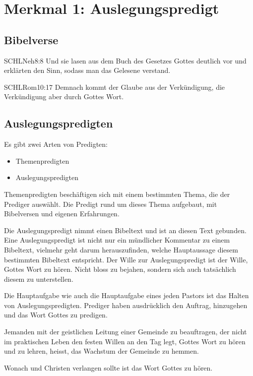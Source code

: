 \documentclass{../../inc/mybib}
\author{OTS}
\begin{document}
\tableofcontents

\section{Merkmal 1: Auslegungspredigt}
\subsection{Bibelverse}
\begin{bibelbox}{SCHL}{Neh}{8:8}
    Und sie lasen aus dem Buch des Gesetzes Gottes deutlich vor und erklärten den Sinn, sodass man das Gelesene verstand.
\end{bibelbox}
\begin{bibelbox}{SCHL}{Rom}{10:17}
    Demnach kommt der Glaube aus der Verkündigung, die Verkündigung aber durch Gottes Wort.
\end{bibelbox}
\subsection{Auslegungspredigten}
Es gibt zwei Arten von Predigten:
\begin{itemize}
    \item Themenpredigten
    \item Auslegungspredigten
\end{itemize}
Themenpredigten beschäftigen sich mit einem bestimmten Thema, die der Prediger auswählt. Die Predigt rund um dieses Thema aufgebaut, mit Bibelversen und eigenen Erfahrungen.

Die Auslegungspredigt nimmt einen Bibeltext und ist an diesen Text gebunden. Eine Auslegungspredigt ist nicht nur ein mündlicher Kommentar zu einem Bibeltext, vielmehr geht darum herauszufinden, welche Hauptaussage diesem bestimmten Bibeltext entspricht. Der Wille zur Auslegungspredigt ist der Wille, Gottes Wort zu hören. Nicht bloss zu bejahen, sondern sich auch tatsächlich diesem zu unterstellen.

Die Hauptaufgabe wie auch die Hauptaufgabe eines jeden Pastors ist das Halten von Auslegungspredigten. Prediger haben ausdrücklich den Auftrag, hinzugehen und das Wort Gottes zu predigen.

Jemanden mit der geistlichen Leitung einer Gemeinde zu beauftragen, der nicht im praktischen Leben den festen Willen an den Tag legt, Gottes Wort zu hören und zu lehren, heisst, das Wachstum der Gemeinde zu hemmen.

Wonach und Christen verlangen sollte ist das Wort Gottes zu hören.
\end{document}
